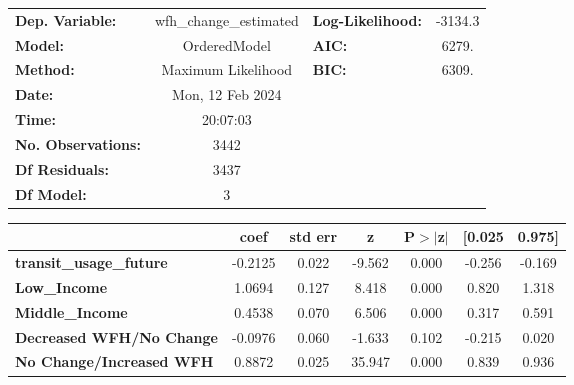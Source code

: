 \documentclass{report}
\begin{document}
\begin{center}
\begin{tabular}{lclc}
\toprule
\textbf{Dep. Variable:}          & wfh\_change\_estimated & \textbf{  Log-Likelihood:    } &   -3134.3   \\
\textbf{Model:}                  &      OrderedModel      & \textbf{  AIC:               } &     6279.   \\
\textbf{Method:}                 &   Maximum Likelihood   & \textbf{  BIC:               } &     6309.   \\
\textbf{Date:}                   &    Mon, 12 Feb 2024    & \textbf{                     } &             \\
\textbf{Time:}                   &        20:07:03        & \textbf{                     } &             \\
\textbf{No. Observations:}       &           3442         & \textbf{                     } &             \\
\textbf{Df Residuals:}           &           3437         & \textbf{                     } &             \\
\textbf{Df Model:}               &              3         & \textbf{                     } &             \\
\bottomrule
\end{tabular}
\begin{tabular}{lcccccc}
                                 & \textbf{coef} & \textbf{std err} & \textbf{z} & \textbf{P$> |$z$|$} & \textbf{[0.025} & \textbf{0.975]}  \\
\midrule
\textbf{transit\_usage\_future}  &      -0.2125  &        0.022     &    -9.562  &         0.000        &       -0.256    &       -0.169     \\
\textbf{Low\_Income}             &       1.0694  &        0.127     &     8.418  &         0.000        &        0.820    &        1.318     \\
\textbf{Middle\_Income}          &       0.4538  &        0.070     &     6.506  &         0.000        &        0.317    &        0.591     \\
\textbf{Decreased WFH/No Change} &      -0.0976  &        0.060     &    -1.633  &         0.102        &       -0.215    &        0.020     \\
\textbf{No Change/Increased WFH} &       0.8872  &        0.025     &    35.947  &         0.000        &        0.839    &        0.936     \\
\bottomrule
\end{tabular}
\end{center}
\end{document}
